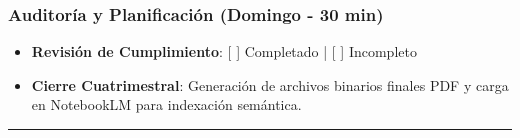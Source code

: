 \documentclass[11pt, a4paper]{article}
\begin{document}
\subsubsection{Auditoría y Planificación (Domingo - 30 min)}
\begin{itemize}
    \item \textbf{Revisión de Cumplimiento}: [ ] Completado | [ ] Incompleto
    \item \textbf{Cierre Cuatrimestral}: Generación de archivos binarios finales PDF y carga en NotebookLM para indexación semántica.
\end{itemize}

\noindent\rule{\textwidth}{0.4pt}
\end{document}
